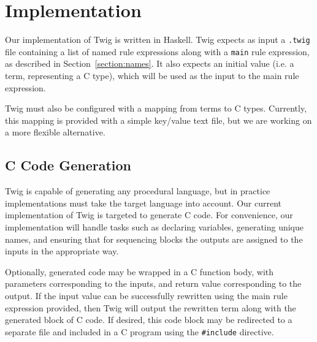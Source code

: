 
\section{Implementation}

Our implementation of Twig is written in Haskell. Twig expects as input a \texttt{.twig} file containing a list of named rule expressions along with a \texttt{main} rule expression, as described in Section~\ref{section:names}. It also expects an initial value (i.e. a term, representing a C type), which will be used as the input to the main rule expression.

Twig must also be configured with a mapping from terms to C types. Currently, this mapping is provided with a simple key/value text file, but we are working on a more flexible alternative.

\subsection{C Code Generation}

Twig is capable of generating any procedural language, but in practice implementations must take the target language into account. Our current implementation of Twig is targeted to generate C code. For convenience, our implementation will handle tasks such as declaring variables, generating unique names, and ensuring that for sequencing blocks the outputs are assigned to the inputs in the appropriate way.

Optionally, generated code may be wrapped in a C function body, with parameters corresponding to the inputs, and return value corresponding to the output. If the input value can be successfully rewritten using the main rule expression provided, then Twig will output the rewritten term along with the generated block of C code. If desired, this code block may be redirected to a separate file and included in a C program using the \texttt{\#include} directive.
